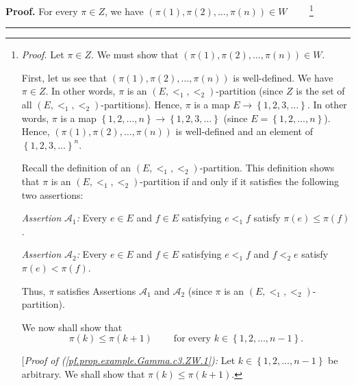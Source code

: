 \documentclass[numbers=enddot,12pt,final,onecolumn,notitlepage,abstracton]{scrartcl}
\theoremstyle{definition}
\newenvironment{proof}[1][Proof]{\noindent\textbf{#1.} }{\ \rule{0.5em}{0.5em}}
\newenvironment{verlong}{}{}
\begin{document}
\begin{verlong}
\begin{footnotesize}
\begin{proof}
For every $\pi\in Z$, we have $\left(  \pi\left(  1\right)  ,\pi\left(
2\right)  ,\ldots,\pi\left(  n\right)  \right)  \in W$%
\ \ \ \ \footnote{\textit{Proof.} Let $\pi\in Z$. We must show that $\left(
\pi\left(  1\right)  ,\pi\left(  2\right)  ,\ldots,\pi\left(  n\right)
\right)  \in W$.
\par
First, let us see that $\left(  \pi\left(  1\right)  ,\pi\left(  2\right)
,\ldots,\pi\left(  n\right)  \right)  $ is well-defined. We have $\pi\in Z$.
In other words, $\pi$ is an $\left(  E,<_{1},<_{2}\right)  $-partition (since
$Z$ is the set of all $\left(  E,<_{1},<_{2}\right)  $-partitions). Hence,
$\pi$ is a map $E\rightarrow\left\{  1,2,3,\ldots\right\}  $. In other words,
$\pi$ is a map $\left\{  1,2,\ldots,n\right\}  \rightarrow\left\{
1,2,3,\ldots\right\}  $ (since $E=\left\{  1,2,\ldots,n\right\}  $).
Hence, $\left(  \pi\left(  1\right)  ,\pi\left(  2\right)  ,\ldots,\pi\left(
n\right)  \right)  $ is well-defined and an element of $\left\{
1,2,3,\ldots\right\}  ^{n}$.
\par
Recall the definition of an $\left(  E,<_{1},<_{2}\right)  $-partition. This
definition shows that $\pi$ is an $\left(  E,<_{1},<_{2}\right)  $-partition
if and only if it satisfies the following two assertions:
\par
\textit{Assertion }$\mathcal{A}_{1}$\textit{:} Every $e\in E$ and $f\in E$
satisfying $e<_{1}f$ satisfy $\pi\left(  e\right)  \leq\pi\left(  f\right)  $.
\par
\textit{Assertion }$\mathcal{A}_{2}$\textit{:} Every $e\in E$ and $f\in E$
satisfying $e<_{1}f$ and $f<_{2}e$ satisfy $\pi\left(  e\right)  <\pi\left(
f\right)  $.
\par
Thus, $\pi$ satisfies Assertions $\mathcal{A}_{1}$ and $\mathcal{A}_{2}$
(since $\pi$ is an $\left(  E,<_{1},<_{2}\right)  $-partition).
\par
We now shall show that
\begin{equation}
\pi\left(  k\right)  \leq\pi\left(  k+1\right)  \ \ \ \ \ \ \ \ \ \ \text{for
every }k\in\left\{  1,2,\ldots,n-1\right\}
.\label{pf.prop.example.Gamma.c3.ZW.1}%
\end{equation}
\par
[\textit{Proof of (\ref{pf.prop.example.Gamma.c3.ZW.1}):} Let $k\in\left\{
1,2,\ldots,n-1\right\}  $ be arbitrary. We shall show that $\pi\left(
k\right)  \leq\pi\left(  k+1\right)  $.
\par
}
\end{proof}
\end{footnotesize}
\end{verlong}
\end{document}

